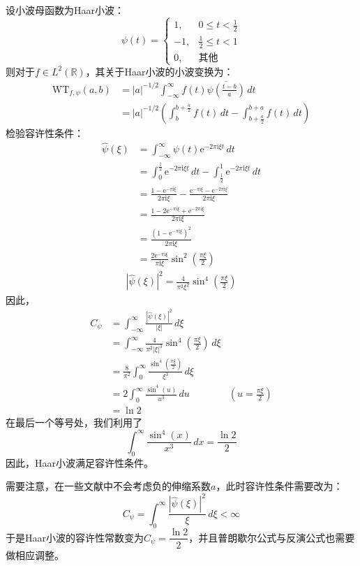 \begin{example}[Haar小波]
    设小波母函数为Haar小波：
    \[\psi(t)=\begin{cases}
    1,&0\leq t<\frac{1}{2}\\
    -1,&\frac{1}{2}\leq t<1\\
    0,&\text{其他}
    \end{cases}\]
    则对于$f\in L^2(\mathbb{R})$，其关于Haar小波的小波变换为：
    \begin{align*}
        \mathrm{WT} _{f,\psi}(a,b)&=|a|^{-1/2}\int_{-\infty}^{\infty}f(t)\overline{\psi\left(\frac{t-b}{a}\right)}\,dt\\
        &=|a|^{-1/2}\left(\int_{b}^{b+\frac{a}{2}}f(t)\,dt-\int_{b+\frac{a}{2}}^{b+a}f(t)\,dt\right)
    \end{align*}
    检验容许性条件：
    \begin{align*}
        \hat{\psi}(\xi)&=\int_{-\infty}^{\infty}\psi(t)\mathrm{e}^{-2\pi \mathrm{i} \xi t}\,dt\\
        &=\int_{0}^{\frac{1}{2}}\mathrm{e}^{-2\pi \mathrm{i} \xi t}\,dt-\int_{\frac{1}{2}}^{1}\mathrm{e}^{-2\pi \mathrm{i} \xi t}\,dt\\
        &=\frac{1-\mathrm{e}^{-\pi \mathrm{i} \xi}}{2\pi \mathrm{i} \xi}-\frac{\mathrm{e}^{-\pi \mathrm{i} \xi}-\mathrm{e}^{-2\pi \mathrm{i} \xi}}{2\pi \mathrm{i} \xi}\\
        &=\frac{1-2\mathrm{e}^{-\pi \mathrm{i} \xi}+\mathrm{e}^{-2\pi \mathrm{i} \xi}}{2\pi \mathrm{i} \xi}\\
        &=\frac{(1-\mathrm{e}^{-\pi \mathrm{i} \xi})^2}{2\pi \mathrm{i} \xi}\\
        &=\frac{2\mathrm{e}^{-\pi \mathrm{i}\xi}}{\pi \mathrm{i}\xi}\sin^2\left(\frac{\pi \xi}{2}\right)
    \end{align*}
    \begin{align*}
        |\hat{\psi}(\xi)|^2=\frac{4}{\pi^2 \xi^2}\sin^4\left(\frac{\pi \xi}{2}\right)
    \end{align*}
    因此，
    \begin{align*}
        C_{\psi}&=\int_{-\infty}^{\infty}\frac{|\hat{\psi}(\xi)|^2}{|\xi|}\,d\xi\\
        &=\int_{-\infty}^{\infty}\frac{4}{\pi^2 |\xi|^3}\sin^4\left(\frac{\pi \xi}{2}\right)\,d\xi\\
        &=\frac{8}{\pi^2}\int_{0}^{\infty}\frac{\sin^4\left(\frac{\pi \xi}{2}\right)}{\xi^3}\,d\xi\\
        &=2\int_{0}^{\infty}\frac{\sin^4(u)}{u^3}\,du&\left(u=\frac{\pi \xi}{2}\right)\\
        &=\ln 2
    \end{align*}
    在最后一个等号处，我们利用了
    $$\int_{0}^{\infty}\dfrac{\sin^4(x)}{x^3}\,dx=\dfrac{\ln 2}{2}$$
    因此，Haar小波满足容许性条件。
\end{example}

需要注意，在一些文献中不会考虑负的伸缩系数$a$，此时容许性条件需要改为：
\[C_{\psi}=\int_{0}^{\infty}\frac{|\hat{\psi}(\xi)|^2}{\xi}\,d\xi<\infty\]
于是Haar小波的容许性常数变为$C_{\psi}=\dfrac{\ln 2}{2}$，并且普朗歇尔公式与反演公式也需要做相应调整。
